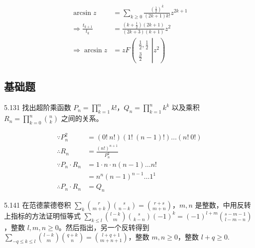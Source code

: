 \begin{align*}
  \arcsin{z} &= \sum_{k \ge 0} \frac{(\frac{1}{2})^{\overline{k}}}{(2k+1) k!} z^{2k+1} \\
  \Rightarrow \frac{t_{k+1}}{t_k} &= \frac{(k+ \frac{1}{2})(2k+1)}{(2k+3)(k+1)} z^2 \\[6pt]
  \Rightarrow \arcsin{z} &= z F
  \left( \left.
    \begin{array}{cccc}
      \frac{1}{2}, \frac{1}{2} \\
      \frac{3}{2}
  \end{array} \right|{z^2} \right)
\end{align*}

\subsection{基础题}

\begin{problem}{5.13}{1}
  找出超阶乘函数 \( P_n = \prod_{k=1}^n k! \)，\( Q_n = \prod_{k=1}^n k^k \) 以及乘积 \( R_n = \prod_{k=0}^n \binom{n}{k} \) 之间的关系。
\end{problem}

\begin{align*}
  \because P_n^2 &= (0! \ n!) (1! \ (n-1)!) \dots (n! \ 0!) \\
  \therefore R_n &= \frac{(n!)^{n+1}}{P_n^2}\\[8pt]
  \because P_n \cdot R_n &= 1 \cdot n \cdot n(n-1) \dots n! \\
  &= n^n (n-1)^{n-1} \dots 1^1 \\
  \therefore P_n \cdot R_n &= Q_n
\end{align*}

\begin{problem}{5.14}{1}
  在范德蒙德卷积 \( \sum_k \binom{r}{m+k} \binom{s}{n-k} = \binom{r+s}{m+n} \)，\( m, n \) 是整数，中用反转上指标的方法证明恒等式 \( \sum_{k \le l} \binom{l-k}{m} \binom{s}{k-n} (-1)^k = (-1)^{l+m} \binom{s-m-1}{l-m-n} \)，整数 \( l, m, n \ge 0 \)。然后指出，另一个反转得到 \( \sum_{-q \le k \le l} \binom{l-k}{m} \binom{q+k}{n} =  \binom{l+q+1}{m+n+1} \)，整数 \( m, n \ge 0 \)，整数 \( l + q \ge 0 \).
\end{problem}

